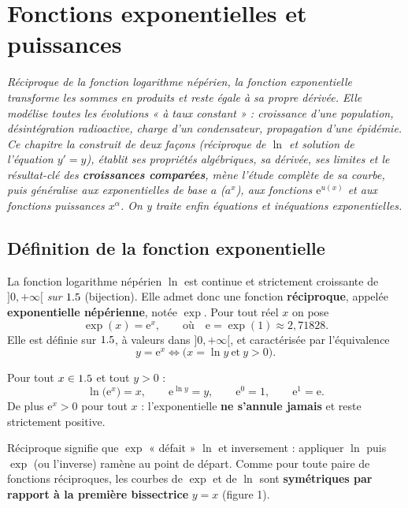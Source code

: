 \chapter{Fonctions exponentielles et puissances}

\noindent\textit{Réciproque de la fonction logarithme népérien, la fonction exponentielle
transforme les sommes en produits et reste égale à sa propre dérivée. Elle modélise toutes
les évolutions « à taux constant » : croissance d'une population, désintégration radioactive,
charge d'un condensateur, propagation d'une épidémie. Ce chapitre la construit de deux façons
(réciproque de $\ln$ et solution de l'équation $y'=y$), établit ses propriétés algébriques,
sa dérivée, ses limites et le résultat-clé des \textbf{croissances comparées}, mène l'étude
complète de sa courbe, puis généralise aux exponentielles de base $a$ ($a^{x}$), aux fonctions
$\mathrm{e}^{u(x)}$ et aux fonctions puissances $x^{\alpha}$. On y traite enfin équations et
inéquations exponentielles.}
\vspace{8pt}

\section{Définition de la fonction exponentielle}

\begin{definition}
La fonction logarithme népérien $\ln$ est continue et strictement croissante de $]0,+\infty[$
\emph{sur} $1.5$ (bijection). Elle admet donc une fonction \textbf{réciproque}, appelée
\textbf{exponentielle népérienne}, notée $\exp$. Pour tout réel $x$ on pose
\[
\exp(x)=\mathrm{e}^{x},\qquad\text{où}\quad \mathrm{e}=\exp(1)\approx 2{,}71828.
\]
Elle est définie sur $1.5$, à valeurs dans $]0,+\infty[$, et caractérisée par l'équivalence
\[
y=\mathrm{e}^{x}\iff\big(x=\ln y\ \text{et}\ y>0\big).
\]
\end{definition}

\begin{propriete}
Pour tout $x\in1.5$ et tout $y>0$ :
\[
\ln\!\big(\mathrm{e}^{x}\big)=x,\qquad \mathrm{e}^{\ln y}=y,\qquad
\mathrm{e}^{0}=1,\qquad \mathrm{e}^{1}=\mathrm{e}.
\]
De plus $\mathrm{e}^{x}>0$ pour tout $x$ : l'exponentielle \textbf{ne s'annule jamais} et reste
strictement positive.
\end{propriete}

\begin{remarque}
Réciproque signifie que $\exp$ « défait » $\ln$ et inversement : appliquer $\ln$ puis $\exp$
(ou l'inverse) ramène au point de départ. Comme pour toute paire de fonctions réciproques,
les courbes de $\exp$ et de $\ln$ sont \textbf{symétriques par rapport à la première bissectrice}
$y=x$ (figure 1).
\end{remarque}

